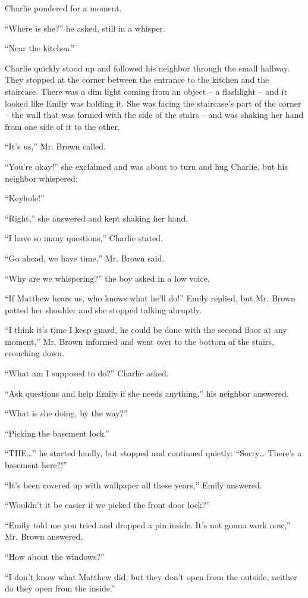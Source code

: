Charlie pondered for a moment.

“Where is she?” he asked, still in a whisper.

“Near the kitchen.”

Charlie quickly stood up and followed his neighbor through the small hallway. They stopped at the corner between the entrance to the kitchen and the staircase. There was a dim light coming from an object – a flashlight – and it looked like Emily was holding it. She was facing the staircase's part of the corner – the wall that was formed with the side of the stairs – and was shaking her hand from one side of it to the other.

“It's us,” Mr. Brown called.

“You're okay!” she exclaimed and was about to turn and hug Charlie, but his neighbor whispered:

“Keyhole!”

“Right,” she answered and kept shaking her hand.

“I have so many questions,” Charlie stated.

“Go ahead, we have time,” Mr. Brown said.

“Why are we whispering?” the boy asked in a low voice.

“If Matthew hears us, who knows what he'll do!” Emily replied, but Mr. Brown patted her shoulder and she stopped talking abruptly.

“I think it's time I keep guard, he could be done with the second floor at any moment,” Mr. Brown informed and went over to the bottom of the stairs, crouching down.

“What am I supposed to do?” Charlie asked.

“Ask questions and help Emily if she needs anything,” his neighbor answered.

“What is she doing, by the way?”

“Picking the basement lock.”

“THE…” he started loudly, but stopped and continued quietly: “Sorry… There's a basement here?!”

“It's been covered up with wallpaper all these years,” Emily answered.

“Wouldn't it be easier if we picked the front door lock?”

“Emily told me you tried and dropped a pin inside. It's not gonna work now,” Mr. Brown answered.

“How about the windows?”

“I don't know what Matthew did, but they don't open from the outside, neither do they open from the inside.”


